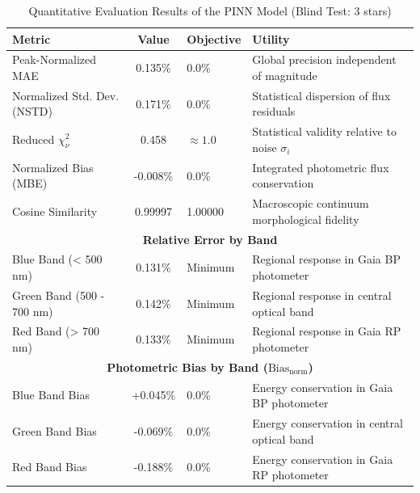 
\begin{table}[htpb]
\centering
\caption{Quantitative Evaluation Results of the PINN Model (Blind Test: 3 stars)}
\label{tab:pinn_evaluation}
\begin{tabular}{lcll}
\hline
\textbf{Metric} & \textbf{Value} & \textbf{Objective} & \textbf{Utility} \\
\hline
Peak-Normalized MAE & 0.135\% & 0.0\% & Global precision independent of magnitude \\
Normalized Std. Dev. (NSTD) & 0.171\% & 0.0\% & Statistical dispersion of flux residuals \\
Reduced $\chi^2_\nu$ & 0.458 & $\approx 1.0$ & Statistical validity relative to noise $\sigma_i$ \\
Normalized Bias (MBE) & -0.008\% & 0.0\% & Integrated photometric flux conservation \\
Cosine Similarity & 0.99997 & 1.00000 & Macroscopic continuum morphological fidelity \\
\hline
\multicolumn{4}{c}{\textbf{Relative Error by Band}} \\
\hline
Blue Band (< 500 nm) & 0.131\% & Minimum & Regional response in Gaia BP photometer \\
Green Band (500 - 700 nm) & 0.142\% & Minimum & Regional response in central optical band \\
Red Band (> 700 nm) & 0.133\% & Minimum & Regional response in Gaia RP photometer \\
\hline
\multicolumn{4}{c}{\textbf{Photometric Bias by Band ($\text{Bias}_{\text{norm}}$)}} \\
\hline
Blue Band Bias & +0.045\% & 0.0\% & Energy conservation in Gaia BP photometer \\
Green Band Bias & -0.069\% & 0.0\% & Energy conservation in central optical band \\
Red Band Bias & -0.188\% & 0.0\% & Energy conservation in Gaia RP photometer \\
\hline
\end{tabular}
\end{table}
